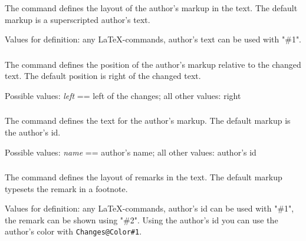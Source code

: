 \subsubsection{}
\DescribeMacro{\setauthormarkup}

The command  defines the layout of the author's markup in the text.
The default markup is a superscripted author's text.

Values for definition: any \LaTeX-commands, author's text can be used with "\#1".




\subsubsection{}
\DescribeMacro{\setauthormarkupposition}

The command  defines the position of the author's markup relative to the changed text.
The default position is right of the changed text.

Possible values: \emph{left} == left of the changes; all other values: right




\subsubsection{}
\DescribeMacro{\setauthormarkuptext}

The command  defines the text for the author's markup.
The default markup is the author's id.

Possible values: \emph{name} == author's name; all other values: author's id




\subsubsection{}
\DescribeMacro{\setremarkmarkup}

The command  defines the layout of remarks in the text.
The default markup typesets the remark in a footnote.

Values for definition: any \LaTeX-commands, author's id can be used with "\#1", the remark can be shown using "\#2".
Using the author's id you can use the author's color with \texttt{Changes@Color\#1}.

